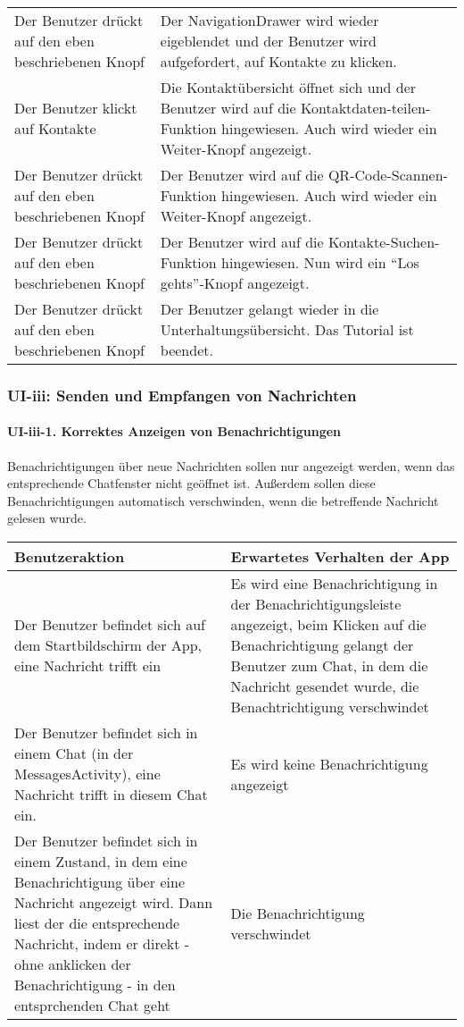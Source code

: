 \begin{longtable}{|p{8cm}|p{8.5cm}|}
Der Benutzer drückt auf den eben beschriebenen Knopf & Der
NavigationDrawer wird wieder eigeblendet und der Benutzer wird
aufgefordert, auf Kontakte zu klicken.\tabularnewline
Der Benutzer klickt auf Kontakte & Die Kontaktübersicht öffnet sich und
der Benutzer wird auf die Kontaktdaten-teilen-Funktion hingewiesen. Auch
wird wieder ein Weiter-Knopf angezeigt.\tabularnewline
Der Benutzer drückt auf den eben beschriebenen Knopf & Der Benutzer wird
auf die QR-Code-Scannen-Funktion hingewiesen. Auch wird wieder ein
Weiter-Knopf angezeigt.\tabularnewline
Der Benutzer drückt auf den eben beschriebenen Knopf & Der Benutzer wird
auf die Kontakte-Suchen-Funktion hingewiesen. Nun wird ein ``Los
gehts''-Knopf angezeigt.\tabularnewline
Der Benutzer drückt auf den eben beschriebenen Knopf & Der Benutzer
gelangt wieder in die Unterhaltungsübersicht. Das Tutorial ist
beendet.\tabularnewline
\hline
\end{longtable}



\clearpage
\subsubsection{UI-iii: Senden und Empfangen von
Nachrichten}\label{iii-senden-und-empfangen-von-nachrichten}

\paragraph{UI-iii-1. Korrektes Anzeigen von
Benachrichtigungen}\label{korrektes-anzeigen-von-benachrichtigungen}

Benachrichtigungen über neue Nachrichten sollen nur angezeigt werden,
wenn das entsprechende Chatfenster nicht geöffnet ist. Außerdem sollen
diese Benachrichtigungen automatisch verschwinden, wenn die betreffende
Nachricht gelesen wurde.

\begin{longtable}{|p{8cm}|p{8.5cm}|}
\hline
Benutzeraktion & Erwartetes Verhalten der App\tabularnewline
\hline

Der Benutzer befindet sich auf dem Startbildschirm der App, eine
Nachricht trifft ein & Es wird eine Benachrichtigung in der
Benachrichtigungsleiste angezeigt, beim Klicken auf die Benachrichtigung
gelangt der Benutzer zum Chat, in dem die Nachricht gesendet wurde, die
Benachtrichtigung verschwindet\tabularnewline
Der Benutzer befindet sich in einem Chat (in der MessagesActivity), eine
Nachricht trifft in diesem Chat ein. & Es wird keine Benachrichtigung
angezeigt\tabularnewline
Der Benutzer befindet sich in einem Zustand, in dem eine
Benachrichtigung über eine Nachricht angezeigt wird. Dann liest der die
entsprechende Nachricht, indem er direkt - ohne anklicken der
Benachrichtigung - in den entsprchenden Chat geht & Die Benachrichtigung
verschwindet\tabularnewline
\hline
\end{longtable}

